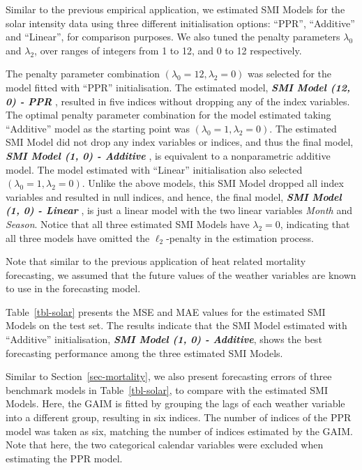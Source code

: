 \documentclass[
  11pt,
  a4paper,
]{article}
\begin{document}
Similar to the previous empirical application, we estimated SMI Models
for the solar intensity data using three different initialisation
options: ``PPR'', ``Additive'' and ``Linear'', for comparison purposes.
We also tuned the penalty parameters \(\lambda_{0}\) and
\(\lambda_{2}\), over ranges of integers from 1 to 12, and 0 to 12
respectively.

The penalty parameter combination
\((\lambda_{0} = 12, \lambda_{2} = 0)\) was selected for the model
fitted with ``PPR'' initialisation. The estimated model,
\textbf{\emph{SMI Model (12, 0) - PPR }}, resulted in five indices
without dropping any of the index variables. The optimal penalty
parameter combination for the model estimated taking ``Additive'' model
as the starting point was \((\lambda_{0} = 1, \lambda_{2} = 0)\). The
estimated SMI Model did not drop any index variables or indices, and
thus the final model, \textbf{\emph{SMI Model (1, 0) - Additive }}, is
equivalent to a nonparametric additive model. The model estimated with
``Linear'' initialisation also selected
\((\lambda_{0} = 1, \lambda_{2} = 0)\). Unlike the above models, this
SMI Model dropped all index variables and resulted in null indices, and
hence, the final model, \textbf{\emph{SMI Model (1, 0) - Linear }}, is
just a linear model with the two linear variables \emph{Month} and
\emph{Season}. Notice that all three estimated SMI Models have
\(\lambda_{2} = 0\), indicating that all three models have omitted the
\(\ell_{2}\)-penalty in the estimation process.

Note that similar to the previous application of heat related mortality
forecasting, we assumed that the future values of the weather variables
are known to use in the forecasting model.

Table~\ref{tbl-solar} presents the MSE and MAE values for the estimated
SMI Models on the test set. The results indicate that the SMI Model
estimated with ``Additive'' initialisation, \textbf{\emph{SMI Model (1,
0) - Additive}}, shows the best forecasting performance among the three
estimated SMI Models.

Similar to Section~\ref{sec-mortality}, we also present forecasting
errors of three benchmark models in Table~\ref{tbl-solar}, to compare
with the estimated SMI Models. Here, the GAIM is fitted by grouping the
lags of each weather variable into a different group, resulting in six
indices. The number of indices of the PPR model was taken as six,
matching the number of indices estimated by the GAIM. Note that here,
the two categorical calendar variables were excluded when estimating the
PPR model.
\end{document}
